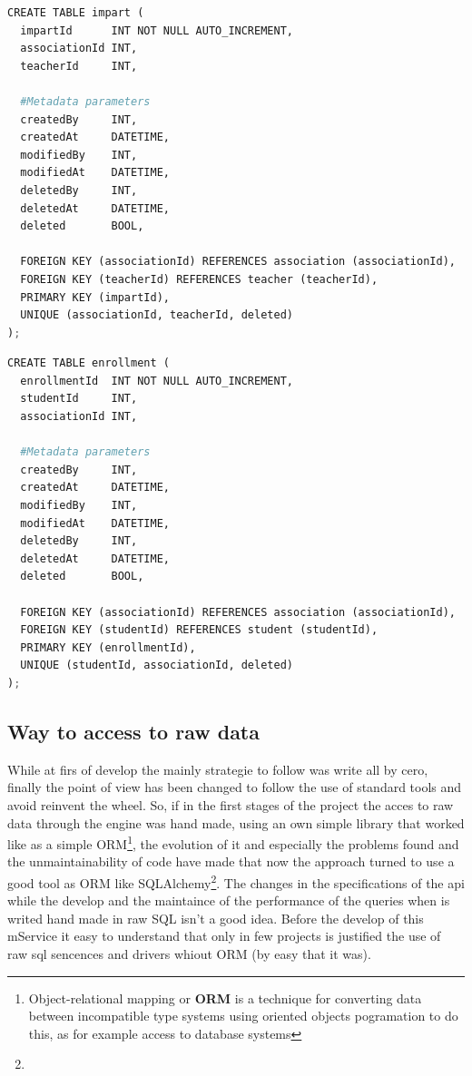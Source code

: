 \begin{lstlisting}[language=python,frame=none]
CREATE TABLE impart (
  impartId      INT NOT NULL AUTO_INCREMENT,
  associationId INT,
  teacherId     INT,

  #Metadata parameters
  createdBy     INT,
  createdAt     DATETIME,
  modifiedBy    INT,
  modifiedAt    DATETIME,
  deletedBy     INT,
  deletedAt     DATETIME,
  deleted       BOOL,

  FOREIGN KEY (associationId) REFERENCES association (associationId),
  FOREIGN KEY (teacherId) REFERENCES teacher (teacherId),
  PRIMARY KEY (impartId),
  UNIQUE (associationId, teacherId, deleted)
);
\end{lstlisting}

\begin{lstlisting}[language=python,frame=none]
CREATE TABLE enrollment (
  enrollmentId  INT NOT NULL AUTO_INCREMENT,
  studentId     INT,
  associationId INT,

  #Metadata parameters
  createdBy     INT,
  createdAt     DATETIME,
  modifiedBy    INT,
  modifiedAt    DATETIME,
  deletedBy     INT,
  deletedAt     DATETIME,
  deleted       BOOL,

  FOREIGN KEY (associationId) REFERENCES association (associationId),
  FOREIGN KEY (studentId) REFERENCES student (studentId),
  PRIMARY KEY (enrollmentId),
  UNIQUE (studentId, associationId, deleted)
);
\end{lstlisting}





\subsection{Way to access to raw data}

While at firs of develop the mainly strategie to follow was write
all by cero, finally the point of view has been changed to follow
the use of standard tools and avoid reinvent the wheel.
\intro
So, if in the first stages of the project the acces to raw data through
the engine was hand made, using an own simple library that worked
like as a simple ORM\footnote{Object-relational mapping or \textbf{ORM} is a
technique for converting data between incompatible
type systems using oriented objects pogramation to do this, as for example access
to database systems}, the evolution of it and especially the problems
found and the unmaintainability of code have made that now the approach
turned to use a good tool as ORM like SQLAlchemy\footnote{}.
\intro
The changes in the specifications of the api while the develop and
the maintaince of the performance of the queries when is writed hand
made in raw SQL isn't a good idea. Before the develop of this mService
it easy to understand that only in few projects is justified the use
of raw sql sencences and drivers whiout ORM (by easy that it was).


